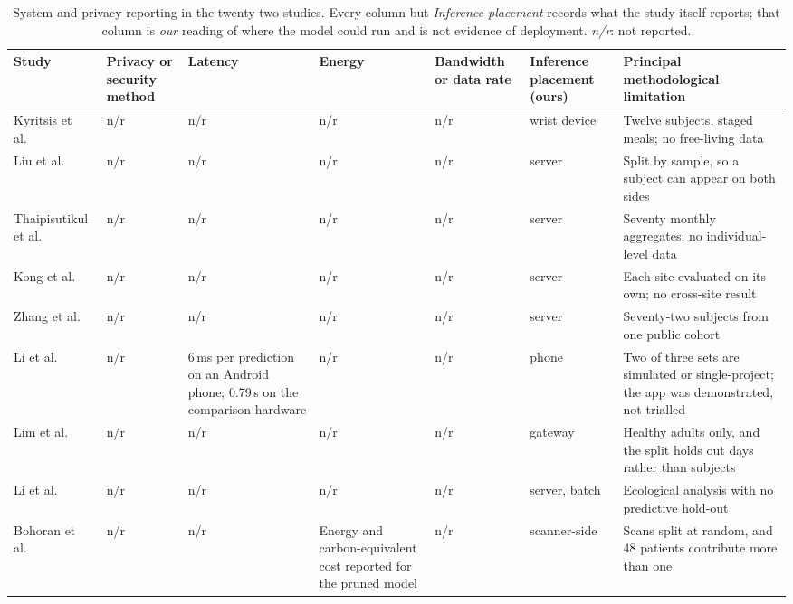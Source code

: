 \documentclass[journal]{IEEEtran}
\begin{document}
\begin{table}[tbp]
\centering
\caption{System and privacy reporting in the twenty-two studies. Every column but \emph{Inference placement} records what the study itself reports; that column is \emph{our} reading of where the model could run and is not evidence of deployment. \emph{n/r}: not reported.}
\label{tab:deployrep}
\footnotesize
\setlength{\tabcolsep}{2pt}
\renewcommand{\arraystretch}{1.0}
\begin{tabularx}{\textwidth}{L{1.9cm} L{2.9cm} L{2.6cm} L{1.5cm} L{1.9cm} L{1.9cm} X}
\toprule
\textbf{Study} & \textbf{Privacy or security method} & \textbf{Latency} & \textbf{Energy} & \textbf{Bandwidth or data rate} & \textbf{Inference placement (ours)} & \textbf{Principal methodological limitation} \\
\midrule
Kyritsis et al.~\cite{Kyritsis2019EatingBehavior} & n/r & n/r & n/r & n/r & wrist device & Twelve subjects, staged meals; no free-living data \\
\addlinespace[1pt]
Liu et al.~\cite{2} & n/r & n/r & n/r & n/r & server & Split by sample, so a subject can appear on both sides \\
\addlinespace[1pt]
Thaipisutikul et al.~\cite{3} & n/r & n/r & n/r & n/r & server & Seventy monthly aggregates; no individual-level data \\
\addlinespace[1pt]
Kong et al.~\cite{4} & n/r & n/r & n/r & n/r & server & Each site evaluated on its own; no cross-site result \\
\addlinespace[1pt]
Zhang et al.~\cite{9} & n/r & n/r & n/r & n/r & server & Seventy-two subjects from one public cohort \\
\addlinespace[1pt]
Li et al.~\cite{Li2020GluNet} & n/r & 6\,ms per prediction on an Android phone; 0.79\,s on the comparison hardware & n/r & n/r & phone & Two of three sets are simulated or single-project; the app was demonstrated, not trialled \\
\addlinespace[1pt]
Lim et al.~\cite{Lim2025VirtualCGM} & n/r & n/r & n/r & n/r & gateway & Healthy adults only, and the split holds out days rather than subjects \\
\addlinespace[1pt]
Li et al.~\cite{XiaoLi2016DiabetesSpatiotemporal} & n/r & n/r & n/r & n/r & server, batch & Ecological analysis with no predictive hold-out \\
\addlinespace[1pt]
Bohoran et al.~\cite{5} & n/r & n/r & Energy and carbon-equivalent cost reported for the pruned model & n/r & scanner-side & Scans split at random, and 48 patients contribute more than one \\

\end{tabularx}
\end{table}
\end{document}
